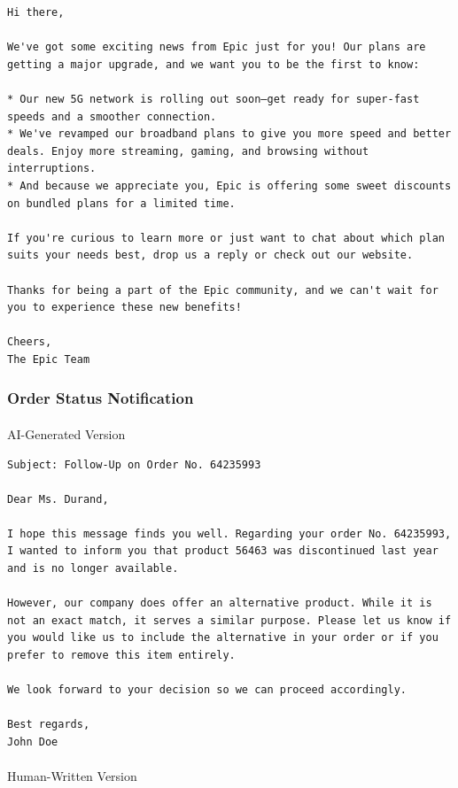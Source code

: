 \documentclass[
]{article}
\makeatletter
\let\oldparagraph\paragraph
\renewcommand{\paragraph}{
    \@ifstar
      \xxxParagraphStar
      \xxxParagraphNoStar
  }
\newcommand{\xxxParagraphStar}[1]{\oldparagraph*{#1}\mbox{}}
\newcommand{\xxxParagraphNoStar}[1]{\oldparagraph{#1}\mbox{}}
\makeatother
\begin{document}
\begin{verbatim}
Hi there,

We've got some exciting news from Epic just for you! Our plans are getting a major upgrade, and we want you to be the first to know:

* Our new 5G network is rolling out soon—get ready for super-fast speeds and a smoother connection.
* We've revamped our broadband plans to give you more speed and better deals. Enjoy more streaming, gaming, and browsing without interruptions.
* And because we appreciate you, Epic is offering some sweet discounts on bundled plans for a limited time.

If you're curious to learn more or just want to chat about which plan suits your needs best, drop us a reply or check out our website.

Thanks for being a part of the Epic community, and we can't wait for you to experience these new benefits!

Cheers,
The Epic Team
\end{verbatim}

\subsubsection{Order Status
Notification}\label{order-status-notification}

\paragraph{AI-Generated Version}\label{ai-generated-version-1}

\begin{verbatim}
Subject: Follow-Up on Order No. 64235993

Dear Ms. Durand,

I hope this message finds you well. Regarding your order No. 64235993, I wanted to inform you that product 56463 was discontinued last year and is no longer available.

However, our company does offer an alternative product. While it is not an exact match, it serves a similar purpose. Please let us know if you would like us to include the alternative in your order or if you prefer to remove this item entirely.

We look forward to your decision so we can proceed accordingly.

Best regards,
John Doe
\end{verbatim}

\paragraph{Human-Written Version}\label{human-written-version-1}
\end{document}
